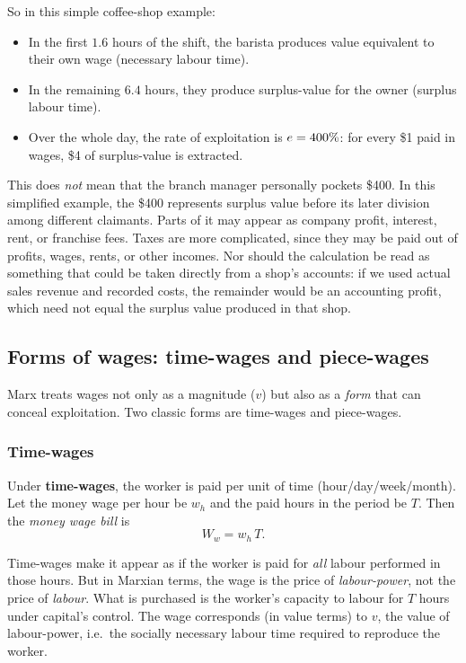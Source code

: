 \begin{example}
So in this simple coffee-shop example:

\begin{itemize}[leftmargin=1.5em]
  \item In the first $1.6$ hours of the shift, the barista produces value
        equivalent to their own wage (necessary labour time).
  \item In the remaining $6.4$ hours, they produce surplus-value for the owner
        (surplus labour time).
  \item Over the whole day, the rate of exploitation is $e = 400\%$:
        for every \$1 paid in wages, \$4 of surplus-value is extracted.
\end{itemize}

This does \emph{not} mean that the branch manager personally pockets \$400. In this simplified example, the \$400 represents surplus value before its later division among different claimants. Parts of it may appear as company profit, interest, rent, or franchise fees. Taxes are more complicated, since they may be paid out of profits, wages, rents, or other incomes. Nor should the calculation be read as something that could be taken directly from a shop's accounts: if we used actual sales revenue and recorded costs, the remainder would be an accounting profit, which need not equal the surplus value produced in that shop.

\end{example}

\subsection{Forms of wages: time-wages and piece-wages}
\label{sec:wage-forms}

Marx treats wages not only as a magnitude ($v$) but also as a \emph{form} that can
conceal exploitation.\cite{Marx1867} Two classic forms are time-wages and piece-wages.

\subsubsection*{Time-wages}

Under \textbf{time-wages}, the worker is paid per unit of time (hour/day/week/month).
Let the money wage per hour be $w_h$ and the paid hours in the period be $T$.
Then the \emph{money wage bill} is
\[
  W_w = w_h \, T.
\]

Time-wages make it appear as if the worker is paid for \emph{all} labour performed in
those hours. But in Marxian terms, the wage is the price of \emph{labour-power}, not the
price of \emph{labour}. What is purchased is the worker's capacity to labour for $T$
hours under capital's control. The wage corresponds (in value terms) to $v$, the value of
labour-power, i.e.\ the socially necessary labour time required to reproduce the worker.

